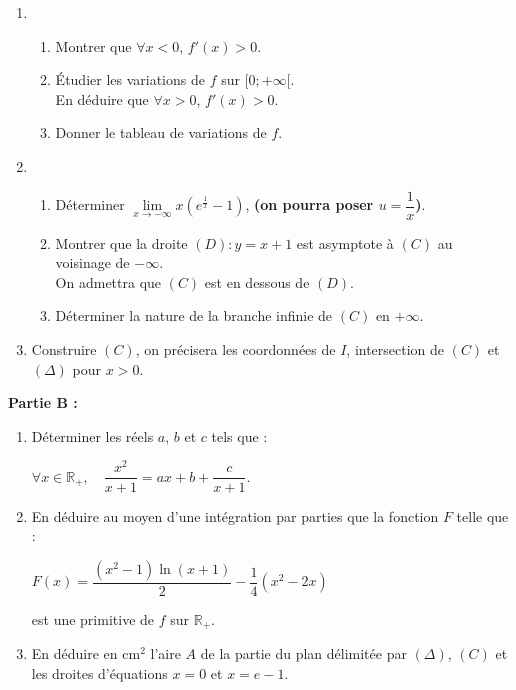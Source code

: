 \documentclass[12pt,a4paper]{article}
\begin{document}
\begin{multicols}{2}
\begin{enumerate}
    \item 
    \begin{enumerate}
        \item Montrer que \( \forall x < 0 \), \( f'(x) > 0 \).
        \item Étudier les variations de \( f \) sur \( [0 ; +\infty[ \).\\
        En déduire que \( \forall x > 0 \), \( f'(x) > 0 \).
        \item Donner le tableau de variations de \( f \).
    \end{enumerate}
    \item
\begin{enumerate}
    \item Déterminer \( \lim\limits_{x \to -\infty} x \left( e^{\frac{1}{x}} - 1 \right) \), \textbf{(on pourra poser \( u = \dfrac{1}{x} \))}.
    \item Montrer que la droite \( (D) : y = x + 1 \) est asymptote à \( (C) \) au voisinage de \( -\infty \).\\
    On admettra que \( (C) \) est en dessous de \( (D) \).
    \item Déterminer la nature de la branche infinie de \( (C) \) en \( +\infty \).
\end{enumerate}

\item Construire \( (C) \), on précisera les coordonnées de \( I \), intersection de \( (C) \) et \( (\Delta) \) pour \( x > 0 \).

\end{enumerate}
\textbf{Partie B :}
\begin{enumerate}
    \item Déterminer les réels \( a \), \( b \) et \( c \) tels que :
    
    \(
    \forall x \in \mathbb{R}_+, \quad \dfrac{x^2}{x + 1} = ax + b + \dfrac{c}{x + 1}.
    \)

    \item En déduire au moyen d’une intégration par parties que la fonction \( F \) telle que :

    \(
    F(x) = \dfrac{(x^2 - 1)\ln(x + 1)}{2} - \dfrac{1}{4}(x^2 - 2x)
    \)

    est une primitive de \( f \) sur \( \mathbb{R}_+ \).

    \item En déduire en \( \text{cm}^2 \) l’aire \( A \) de la partie du plan délimitée par \( (\Delta) \), \( (C) \) et les droites d’équations \( x = 0 \) et \( x = e - 1 \).
\end{enumerate}


\end{multicols}
\end{document}

